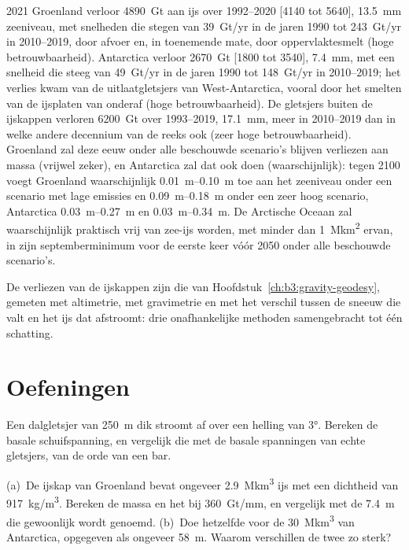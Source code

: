 \begin{dated}{2021}
Groenland verloor \qty{4890}{Gt} aan ijs over 1992--2020 [4140 tot 5640],
\qty{13.5}{mm} zeeniveau, met snelheden die stegen van \qty{39}{Gt/yr} in de
jaren 1990 tot \qty{243}{Gt/yr} in 2010--2019, door afvoer en, in toenemende mate,
door oppervlaktesmelt (hoge betrouwbaarheid). Antarctica verloor \qty{2670}{Gt}
[1800 tot 3540], \qty{7.4}{mm}, met een snelheid die steeg van \qty{49}{Gt/yr} in de
jaren 1990 tot \qty{148}{Gt/yr} in 2010--2019; het verlies kwam van de uitlaatgletsjers van
West-Antarctica, vooral door het smelten van de ijsplaten van onderaf (hoge
betrouwbaarheid). De gletsjers buiten de ijskappen verloren \qty{6200}{Gt} over
1993--2019, \qty{17.1}{mm}, meer in 2010--2019 dan in welke andere decennium van de
reeks ook (zeer hoge betrouwbaarheid). Groenland zal deze eeuw onder alle beschouwde
scenario's blijven verliezen aan massa (vrijwel zeker), en Antarctica zal dat ook
doen (waarschijnlijk): tegen 2100 voegt Groenland waarschijnlijk
\qtyrange{0.01}{0.10}{m} toe aan het zeeniveau onder een scenario met lage emissies
en \qtyrange{0.09}{0.18}{m} onder een zeer hoog scenario, Antarctica
\qtyrange{0.03}{0.27}{m} en \qtyrange{0.03}{0.34}{m}. De Arctische Oceaan
zal waarschijnlijk praktisch vrij van zee-ijs worden, met minder dan
\qty{1}{\mega km^2} ervan, in zijn septemberminimum voor de eerste keer
vóór 2050 onder alle beschouwde scenario's.
\end{dated}

De verliezen van de ijskappen zijn die van Hoofdstuk~\ref{ch:b3:gravity-geodesy},
gemeten met altimetrie, met gravimetrie en met het verschil tussen de sneeuw
die valt en het ijs dat afstroomt: drie onafhankelijke methoden samengebracht
tot één schatting.

\section{Oefeningen}

\begin{exercise}[$\star$]\label{exo:b3:glaciology:1}
Een dalgletsjer van \qty{250}{m} dik stroomt af over een helling van \ang{3}. Bereken
de basale schuifspanning, en vergelijk die met de basale spanningen van echte
gletsjers, van de orde van een bar.
\end{exercise}

\begin{exercise}[$\star$]\label{exo:b3:glaciology:2}
(a)~De ijskap van Groenland bevat ongeveer \qty{2.9}{\mega km^3} ijs met
een dichtheid van \qty{917}{kg/m^3}. Bereken de massa en het  bij
\qty{360}{Gt/mm}, en vergelijk met de \qty{7.4}{m} die gewoonlijk wordt genoemd.
(b)~Doe hetzelfde voor de \qty{30}{\mega km^3} van Antarctica, opgegeven als ongeveer
\qty{58}{m}. Waarom verschillen de twee zo sterk?
\end{exercise}

